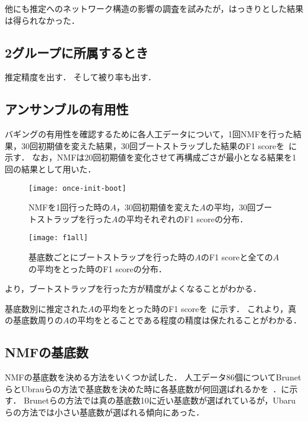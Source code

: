 他にも推定へのネットワーク構造の影響の調査を試みたが，はっきりとした結果は得られなかった．

\subsection{2グループに所属するとき}
推定精度を出す．
そして被り率も出す．

\subsection{アンサンブルの有用性}
バギングの有用性を確認するために各人工データについて，1回NMFを行った結果，30回初期値を変えた結果，30回ブートストラップした結果のF1 scoreを~に示す．
なお，NMFは20回初期値を変化させて再構成ごさが最小となる結果を1回の結果として用いた．
\begin{figure}[htbp]
    \begin{minipage}{0.5\hsize}
			\begin{center}
					\texttt{[image: once-init-boot]}
					\caption{NMFを1回行った時の$A$，30回初期値を変えた$A$の平均，30回ブートストラップを行った$A$の平均それぞれのF1 scoreの分布．}
					\label{fig:once-init-boot}
			\end{center}
		\end{minipage}
    \begin{minipage}{0.5\hsize}
			\begin{center}
					\texttt{[image: f1all]}
					\caption{基底数ごとにブートストラップを行った時の$A$のF1 scoreと全ての$A$の平均をとった時のF1 scoreの分布．}
					\label{fig:f1all}
			\end{center}
		\end{minipage}
\end{figure}
より，ブートストラップを行った方が精度がよくなることがわかる．

基底数別に推定された$A$の平均をとった時のF1 scoreを~に示す．
これより，真の基底数周りの$A$の平均をとることである程度の精度は保たれることがわかる．

\subsection{NMFの基底数}
NMFの基底数を決める方法をいくつか試した．
人工データ86個についてBrunetらとUbrauらの方法で基底数を決めた時に各基底数が何回選ばれるかを~．に示す．
Brunetらの方法では真の基底数10に近い基底数が選ばれているが，Ubaruらの方法では小さい基底数が選ばれる傾向にあった．

